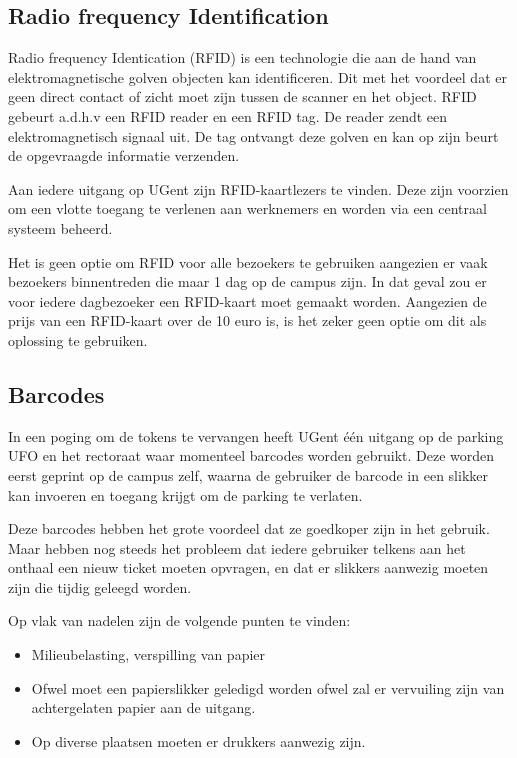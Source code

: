 \subsection{Radio frequency Identification}

Radio frequency Identication (RFID) is een technologie die aan de hand van elektromagnetische golven objecten kan identificeren. Dit met het voordeel dat er geen direct contact of zicht moet zijn tussen de scanner en het object. RFID gebeurt a.d.h.v een RFID reader en een RFID tag. De reader zendt een elektromagnetisch signaal uit. De tag ontvangt deze golven en kan op zijn beurt de opgevraagde informatie verzenden. \autocite{li2009design}

Aan iedere uitgang op UGent zijn RFID-kaartlezers te vinden. Deze zijn voorzien om een vlotte toegang te verlenen aan werknemers en worden via een centraal systeem beheerd.

Het is geen optie om RFID voor alle bezoekers te gebruiken aangezien er vaak bezoekers binnentreden die maar 1 dag op de campus zijn. In dat geval zou er voor iedere dagbezoeker een RFID-kaart moet gemaakt worden. Aangezien de prijs van een RFID-kaart over de 10 euro is, is het zeker geen optie om dit als oplossing te gebruiken.

\subsection{Barcodes}
In een poging om de tokens te vervangen heeft UGent één uitgang op de parking UFO en het rectoraat waar momenteel barcodes worden gebruikt. Deze worden eerst geprint op de campus zelf, waarna de gebruiker de barcode in een slikker kan invoeren en toegang krijgt om de parking te verlaten.

Deze barcodes hebben het grote voordeel dat ze goedkoper zijn in het gebruik. Maar hebben nog steeds het probleem dat iedere gebruiker telkens aan het onthaal een nieuw ticket moeten opvragen, en dat er slikkers aanwezig moeten zijn die tijdig geleegd worden.

Op vlak van nadelen zijn de volgende punten te vinden:
\begin{itemize}
	\item Milieubelasting, verspilling van papier
	\item Ofwel moet een papierslikker geledigd worden ofwel zal er vervuiling zijn van achtergelaten papier aan de uitgang.
	\item Op diverse plaatsen moeten er drukkers aanwezig zijn.
\end{itemize}


